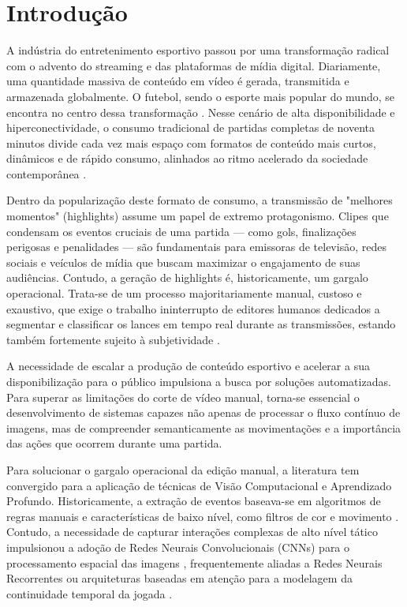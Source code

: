 \documentclass[a4paper,10pt, twocolumn]{article}
\begin{document}
\section{Introdução}

A indústria do entretenimento esportivo passou por uma transformação radical com o advento do streaming e das plataformas de mídia digital. Diariamente, uma quantidade massiva de conteúdo em vídeo é gerada, transmitida e armazenada globalmente. O futebol, sendo o esporte mais popular do mundo, se encontra no centro dessa transformação \cite{seweryn2026survey}. Nesse cenário de alta disponibilidade e hiperconectividade, o consumo tradicional de partidas completas de noventa minutos divide cada vez mais espaço com formatos de conteúdo mais curtos, dinâmicos e de rápido consumo, alinhados ao ritmo acelerado da sociedade contemporânea \cite{morelli2023fifa, bleier2021survey, deloitte2023sports}.

Dentro da popularização deste formato de consumo, a transmissão de "melhores momentos" (highlights) assume um papel de extremo protagonismo. Clipes que condensam os eventos cruciais de uma partida — como gols, finalizações perigosas e penalidades — são fundamentais para emissoras de televisão, redes sociais e veículos de mídia que buscam maximizar o engajamento de suas audiências. Contudo, a geração de highlights é, historicamente, um gargalo operacional. Trata-se de um processo majoritariamente manual, custoso e exaustivo, que exige o trabalho ininterrupto de editores humanos dedicados a segmentar e classificar os lances em tempo real durante as transmissões, estando também fortemente sujeito à subjetividade \cite{seweryn2026survey, akan2023use}.

A necessidade de escalar a produção de conteúdo esportivo e acelerar a sua disponibilização para o público impulsiona a busca por soluções automatizadas. Para superar as limitações do corte de vídeo manual, torna-se essencial o desenvolvimento de sistemas capazes não apenas de processar o fluxo contínuo de imagens, mas de compreender semanticamente as movimentações e a importância das ações que ocorrem durante uma partida.

Para solucionar o gargalo operacional da edição manual, a literatura tem convergido para a aplicação de técnicas de Visão Computacional e Aprendizado Profundo. Historicamente, a extração de eventos baseava-se em algoritmos de regras manuais e características de baixo nível, como filtros de cor e movimento \cite{seweryn2026survey, akan2023use}. Contudo, a necessidade de capturar interações complexas de alto nível tático impulsionou a adoção de Redes Neurais Convolucionais (CNNs) para o processamento espacial das imagens \cite{akan2023use, xu2025deep}, frequentemente aliadas a Redes Neurais Recorrentes ou arquiteturas baseadas em atenção para a modelagem da continuidade temporal da jogada \cite{yin2024survey, majeed2025real}.
\end{document}
